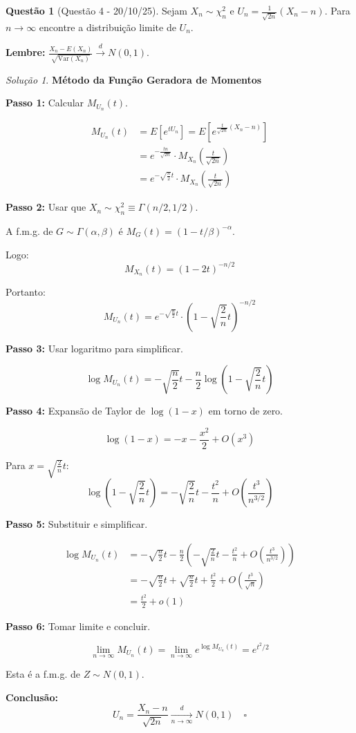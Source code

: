 \documentclass[12pt,a4paper]{article}
\theoremstyle{definition}
\newtheorem{questao}{Questão}[section]
\theoremstyle{remark}
\newtheorem{solucao}{Solução}[section]
\begin{document}
\begin{questao}[Questão 4 - 20/10/25]
Sejam $X_n \sim \chi^2_n$ e $U_n = \frac{1}{\sqrt{2n}}(X_n - n)$. Para $n \to \infty$ encontre a distribuição limite de $U_n$. 

\textbf{Lembre:} $\frac{X_n - E(X_n)}{\sqrt{\text{Var}(X_n)}} \xrightarrow{d} N(0,1)$.
\end{questao}

\begin{solucao}
\textbf{Método da Função Geradora de Momentos}

\textbf{Passo 1:} Calcular $M_{U_n}(t)$.

\begin{align}
M_{U_n}(t) &= E\left[ e^{t U_n} \right] = E\left[ e^{\frac{t}{\sqrt{2n}}(X_n - n)} \right] \\
&= e^{-\frac{t n}{\sqrt{2n}}} \cdot M_{X_n}\left( \frac{t}{\sqrt{2n}} \right) \\
&= e^{-\sqrt{\frac{n}{2}} t} \cdot M_{X_n}\left( \frac{t}{\sqrt{2n}} \right)
\end{align}

\textbf{Passo 2:} Usar que $X_n \sim \chi^2_n \equiv \Gamma(n/2, 1/2)$.

A f.m.g. de $G \sim \Gamma(\alpha, \beta)$ é $M_G(t) = (1 - t/\beta)^{-\alpha}$.

Logo:
\[
M_{X_n}(t) = \left( 1 - 2t \right)^{-n/2}
\]

Portanto:
\[
M_{U_n}(t) = e^{-\sqrt{\frac{n}{2}} t} \cdot \left( 1 - \sqrt{\frac{2}{n}} t \right)^{-n/2}
\]

\textbf{Passo 3:} Usar logaritmo para simplificar.

\[
\log M_{U_n}(t) = -\sqrt{\frac{n}{2}} t - \frac{n}{2} \log\left( 1 - \sqrt{\frac{2}{n}} t \right)
\]

\textbf{Passo 4:} Expansão de Taylor de $\log(1-x)$ em torno de zero.

\[
\log(1 - x) = -x - \frac{x^2}{2} + O(x^3)
\]

Para $x = \sqrt{\frac{2}{n}} t$:
\[
\log\left(1 - \sqrt{\frac{2}{n}} t\right) = -\sqrt{\frac{2}{n}} t - \frac{t^2}{n} + O\left( \frac{t^3}{n^{3/2}} \right)
\]

\textbf{Passo 5:} Substituir e simplificar.

\begin{align}
\log M_{U_n}(t) &= -\sqrt{\frac{n}{2}} t - \frac{n}{2} \left( -\sqrt{\frac{2}{n}} t - \frac{t^2}{n} + O\left( \frac{t^3}{n^{3/2}} \right) \right) \\
&= -\sqrt{\frac{n}{2}} t + \sqrt{\frac{n}{2}} t + \frac{t^2}{2} + O\left( \frac{t^3}{\sqrt{n}} \right) \\
&= \frac{t^2}{2} + o(1)
\end{align}

\textbf{Passo 6:} Tomar limite e concluir.

\[
\lim_{n \to \infty} M_{U_n}(t) = \lim_{n \to \infty} e^{\log M_{U_n}(t)} = e^{t^2/2}
\]

Esta é a f.m.g. de $Z \sim N(0,1)$.

\textbf{Conclusão:}
\[
U_n = \frac{X_n - n}{\sqrt{2n}} \xrightarrow[n \to \infty]{d} N(0,1) \quad \square
\]
\end{solucao}
\end{document}
